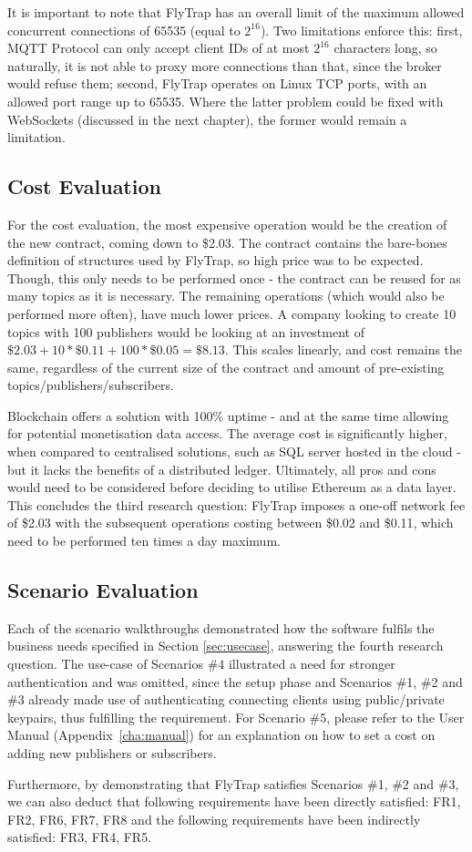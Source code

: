It is important to note that FlyTrap has an overall limit of the maximum allowed concurrent connections of 65535 (equal to $2^{16}$). Two limitations enforce this: first, MQTT Protocol can only accept client IDs of at most $2^{16}$ characters long, so naturally, it is not able to proxy more connections than that, since the broker would refuse them; second, FlyTrap operates on Linux TCP ports, with an allowed port range up to 65535. Where the latter problem could be fixed with WebSockets (discussed in the next chapter), the former would remain a limitation.
\subsection{Cost Evaluation}
For the cost evaluation, the most expensive operation would be the creation of the new contract, coming down to \$2.03. The contract contains the bare-bones definition of structures used by FlyTrap, so high price was to be expected. Though, this only needs to be performed once - the contract can be reused for as many topics as it is necessary. The remaining operations (which would also be performed more often), have much lower prices. A company looking to create 10 topics with 100 publishers would be looking at an investment of $\$2.03 + 10 * \$0.11 + 100 * \$0.05 = \$8.13$. This scales linearly, and cost remains the same, regardless of the current size of the contract and amount of pre-existing topics/publishers/subscribers.

Blockchain offers a solution with 100\% uptime - and at the same time allowing for potential monetisation data access. The average cost is significantly higher, when compared to centralised solutions, such as SQL server hosted in the cloud - but it lacks the benefits of a distributed ledger. Ultimately, all pros and cons would need to be considered before deciding to utilise Ethereum as a data layer. This concludes the third research question: FlyTrap imposes a one-off network fee of \$2.03 with the subsequent operations costing between \$0.02 and \$0.11, which need to be performed ten times a day maximum.
\subsection{Scenario Evaluation}
Each of the scenario walkthroughs demonstrated how the software fulfils the business needs specified in Section \ref{sec:usecase}, answering the fourth research question. The use-case of Scenarios \#4 illustrated a need for stronger authentication and was omitted, since the setup phase and Scenarios \#1, \#2 and \#3 already made use of authenticating connecting clients using public/private keypairs, thus fulfilling the requirement. For Scenario \#5, please refer to the User Manual (Appendix~\ref{cha:manual}) for an explanation on how to set a cost on adding new publishers or subscribers.

Furthermore, by demonstrating that FlyTrap satisfies Scenarios \#1, \#2 and \#3, we can also deduct that following requirements have been directly satisfied: FR1, FR2, FR6, FR7, FR8 and the following requirements have been indirectly satisfied: FR3, FR4, FR5. 
